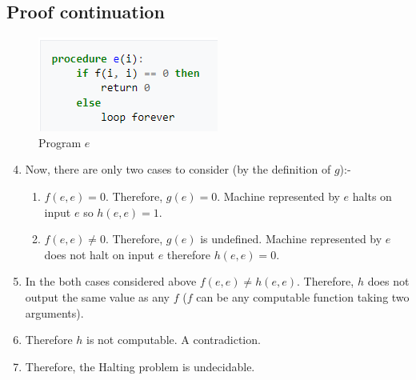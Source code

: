 \documentclass[
11pt,notheorems,hyperref={pdfauthor=whatever}
]{beamer}
\begin{document}
\subsection{Proof continuation}
\begin{frame}

\begin{figure}
    \centering
    \includegraphics{images/program.png}
    \caption{Program $e$}
    \label{fig:program_e}
\end{figure}

\begin{enumerate}
    \setcounter{enumi}{3}
    \item Now, there are only two cases to consider (by the definition of $g$):-
    \begin{enumerate}
        \item $f(e, e) = 0$. Therefore, $g(e) = 0$. Machine represented by $e$ halts on input $e$ so $h(e, e) = 1$.
        \item $f(e, e) \not= 0$. Therefore, $g(e)$ is undefined. Machine represented by $e$ does not halt on input $e$ therefore $h(e, e) = 0$.
    \end{enumerate}
    \item In the both cases considered above $f(e, e) \not= h(e, e)$. Therefore, $h$ does not output the same value as any $f$ ($f$ can be any computable function taking two arguments).
    \item Therefore $h$ is not computable. A contradiction.
    \item Therefore, the Halting problem is undecidable.
\end{enumerate}
\end{frame}

\end{document}

